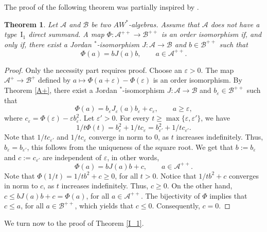 \documentclass[12pt]{amsart}
\newtheorem{thm}{Theorem}[section]
\theoremstyle{definition}
\theoremstyle{remark}
\numberwithin{equation}{section}
\begin{document}
The proof of the following theorem was partially inspired by  \cite[Proof of Theorem 2.2]{Our1}.
\begin{thm}\label{A++}
Let $\mathcal{A}$ and $\mathcal{B}$ be two $AW^*$-algebras.  Assume that $\mathcal{A}$ does not have a type~$\mathrm{I}_1$ direct summand. A map $\Phi:\mathcal{A}^{++}\to\mathcal{B}^{++}$ is an order isomorphism if, and only if, there exist a Jordan $^*$-isomorphism $J:\mathcal{A}\to \mathcal{B}$ and $b\in\mathcal{B}^{++}$ such that $$\Phi(a)=bJ(a)b,\qquad a\in \mathcal{A}^{++}.$$
\end{thm}
\begin{proof}
Only the necessity part requires proof. Choose an $\varepsilon>0$. The map  $\mathcal{A}^+\to\mathcal{B}^+$  defined by $a\mapsto \Phi(a+\varepsilon)-\Phi(\varepsilon)$ is an order isomorphism. By Theorem \ref{A+}, there exist a Jordan $^*$-isomorphism $J:\mathcal{A}\to\mathcal{B}$ and $b_\varepsilon\in\mathcal{B}^{++}$ such that $$\Phi(a)=b_{\varepsilon}J_{\varepsilon}(a)b_{\varepsilon}+c_{\varepsilon}, \qquad a\geq \varepsilon,$$
where $c_{\varepsilon}=\Phi(\varepsilon)-\varepsilon b_{\varepsilon}^2$. Let  $\varepsilon'>0$. For every $t\geq\max\{\varepsilon,\varepsilon'\}$, we have $$1/t\Phi(t)=b_{\varepsilon}^{2}+1/tc_{\varepsilon}=b_{\varepsilon'}^{2}+1/tc_{\varepsilon'}.$$ 
Note that $1/tc_{\varepsilon'}$ and $1/tc_{\varepsilon}$ converge in norm to $0$, as $t$ increases indefinitely. Thus, $b_{\varepsilon}=b_{\varepsilon'}$, this follows from the uniqueness of the square root. We get that $b:=b_{\varepsilon}$ and $c:=c_{\varepsilon'}$ are independent of $\varepsilon$, in other words,    $$\Phi(a)=bJ(a)b+c, \qquad a\in\mathcal{A}^{++}.$$
Note that $\Phi(1/t)=1/tb^2+c\geq 0$, for all $t>0$. Notice that $1/tb^2+c$ converges in norm to $c$, as $t$ increases indefinitely.  Thus, $c\geq 0$. On the other hand, $c\leq bJ(a)b+c=\Phi(a)$, for all $a\in\mathcal{A}^{++}$. The bijectivity of $\Phi$ implies that $c\leq a$, for all $a\in\mathcal{B}^{++}$, which yields that $c\leq 0$. Consequently, $c=0$.  
\end{proof} 

We turn now to the proof of  Theorem \ref{I_1}.
\end{document}
